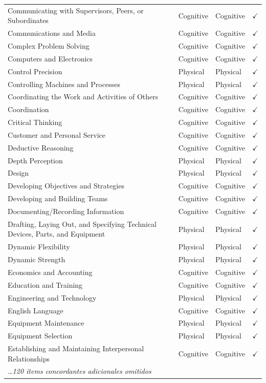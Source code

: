 \begin{table}[htbp]
\begin{tabular}{p{5.8cm} l l c}
  Communicating with Supervisors, Peers, or Subordinates & Cognitive & Cognitive & $\checkmark$ \\
  Communications and Media & Cognitive & Cognitive & $\checkmark$ \\
  Complex Problem Solving & Cognitive & Cognitive & $\checkmark$ \\
  Computers and Electronics & Cognitive & Cognitive & $\checkmark$ \\
  Control Precision & Physical & Physical & $\checkmark$ \\
  Controlling Machines and Processes & Physical & Physical & $\checkmark$ \\
  Coordinating the Work and Activities of Others & Cognitive & Cognitive & $\checkmark$ \\
  Coordination & Cognitive & Cognitive & $\checkmark$ \\
  Critical Thinking & Cognitive & Cognitive & $\checkmark$ \\
  Customer and Personal Service & Cognitive & Cognitive & $\checkmark$ \\
  Deductive Reasoning & Cognitive & Cognitive & $\checkmark$ \\
  Depth Perception & Physical & Physical & $\checkmark$ \\
  Design & Physical & Physical & $\checkmark$ \\
  Developing Objectives and Strategies & Cognitive & Cognitive & $\checkmark$ \\
  Developing and Building Teams & Cognitive & Cognitive & $\checkmark$ \\
  Documenting/Recording Information & Cognitive & Cognitive & $\checkmark$ \\
  Drafting, Laying Out, and Specifying Technical Devices, Parts, and Equipment & Physical & Physical & $\checkmark$ \\
  Dynamic Flexibility & Physical & Physical & $\checkmark$ \\
  Dynamic Strength & Physical & Physical & $\checkmark$ \\
  Economics and Accounting & Cognitive & Cognitive & $\checkmark$ \\
  Education and Training & Cognitive & Cognitive & $\checkmark$ \\
  Engineering and Technology & Physical & Physical & $\checkmark$ \\
  English Language & Cognitive & Cognitive & $\checkmark$ \\
  Equipment Maintenance & Physical & Physical & $\checkmark$ \\
  Equipment Selection & Physical & Physical & $\checkmark$ \\
  Establishing and Maintaining Interpersonal Relationships & Cognitive & Cognitive & $\checkmark$ \\
  \multicolumn{4}{l}{\hspace{1em}\textit{\ldots 120 items concordantes adicionales omitidos}} \\
\bottomrule
\end{tabular}
\end{table}
